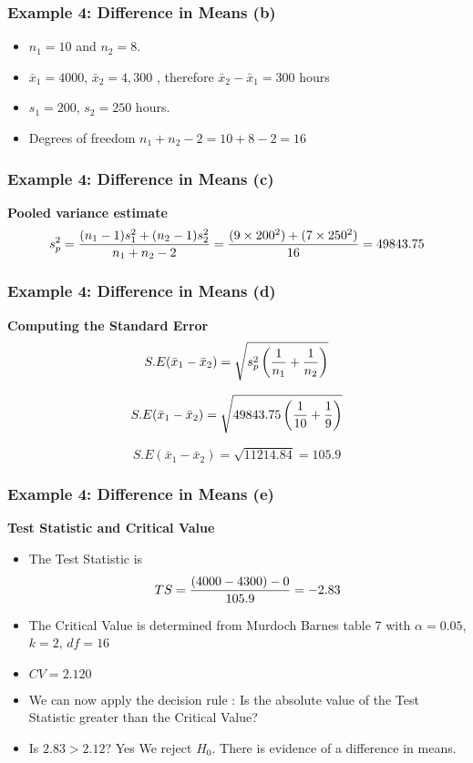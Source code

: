 \begin{frame}
\frametitle{Example 4: Difference in Means (b) }
\begin{itemize}\item $n_1 = 10$ and $n_2 = 8$.
\item $\bar{x}_1 = 4000$, $\bar{x}_2 = 4,300 $ , therefore  $\bar{x}_2 - \bar{x}_1 = 300$ hours
\item $s_1  = 200$, $s_2 = 250$ hours.
\item Degrees of freedom $n_1 + n_2 - 2 = 10 + 8 - 2 = 16$
\end{itemize}\end{frame}
\begin{frame}
\frametitle{Example 4: Difference in Means (c) }
\textbf{Pooled variance estimate}
\[ s^2_p = {(n_1 - 1)s^2_1  + (n_2 - 1)s^2_ 2\over n_1 + n_2 - 2 } = {(9 \times 200^2 ) +( 7 \times 250^2) \over 16 } = 49843.75 \]

\end{frame}
\begin{frame}
\frametitle{Example 4: Difference in Means (d) }
\textbf{Computing the Standard Error}
\[ S.E(\bar{x}_1 - \bar{x}_2) = \sqrt{s^2_p \left({1\over n_1}+{1\over n_2} \right)}\]

\[ S.E(\bar{x}_1 - \bar{x}_2) = \sqrt{49843.75 \left({1\over 10}+{1\over 9} \right)}\]

\[ S.E(\bar{x}_1 - \bar{x}_2) = \sqrt{11214.84} = 105.9\]

\end{frame}

\begin{frame}
\frametitle{Example 4: Difference in Means (e) }
\textbf{Test Statistic and Critical Value}\\
\begin{itemize}
\item The Test Statistic is \[ TS  = {(4000-4300) - 0 \over 105.9}  = -2.83 \]
\item The Critical Value is determined from Murdoch Barnes table 7 with $\alpha = 0.05$, $k=2$, $df = 16 $
\item $CV = 2.120$
\item We can now apply the decision rule : Is the absolute value of the Test Statistic greater than the Critical Value?
\item Is $2.83 > 2.12$? Yes We reject $H_0$. There is evidence of a difference in means.
\end{itemize}
\end{frame}



